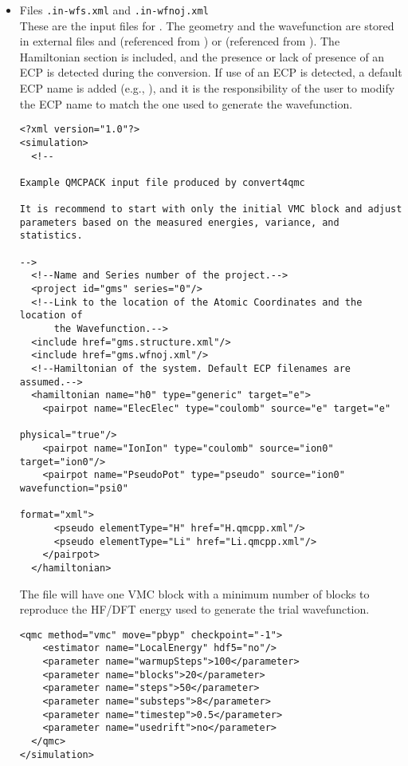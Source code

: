 \begin{itemize}
 \item Files \texttt{.in-wfs.xml} and \texttt{.in-wfnoj.xml} \\ These
   are the input files for \qmcpack.  The geometry and the
   wavefunction are stored in external files 
   and  (referenced from ) or
    (referenced from
   ). The Hamiltonian section is included,
   and the presence or lack of presence of an ECP is detected during the
   conversion. If use of an ECP is detected, a default ECP name is
   added (e.g., ), and it is the responsibility of
   the user to modify the ECP name to match the one used to generate
   the wavefunction.\\
\begin{lstlisting}[style=QMCPXML]
  <?xml version="1.0"?>
<simulation>
  <!--
 
Example QMCPACK input file produced by convert4qmc
 
It is recommend to start with only the initial VMC block and adjust
parameters based on the measured energies, variance, and statistics.

-->
  <!--Name and Series number of the project.-->
  <project id="gms" series="0"/>
  <!--Link to the location of the Atomic Coordinates and the location of 
      the Wavefunction.-->
  <include href="gms.structure.xml"/>
  <include href="gms.wfnoj.xml"/>
  <!--Hamiltonian of the system. Default ECP filenames are assumed.-->
  <hamiltonian name="h0" type="generic" target="e">
    <pairpot name="ElecElec" type="coulomb" source="e" target="e" 
                                                   physical="true"/>
    <pairpot name="IonIon" type="coulomb" source="ion0" target="ion0"/>
    <pairpot name="PseudoPot" type="pseudo" source="ion0" wavefunction="psi0" 
                                                           format="xml">
      <pseudo elementType="H" href="H.qmcpp.xml"/>
      <pseudo elementType="Li" href="Li.qmcpp.xml"/>
    </pairpot>
  </hamiltonian>

 \end{lstlisting}

 The  file will have one VMC block with a
 minimum number of blocks to reproduce the HF/DFT energy used to
 generate the trial wavefunction.
 
 \begin{lstlisting}[style=QMCPXML]
  <qmc method="vmc" move="pbyp" checkpoint="-1">
    <estimator name="LocalEnergy" hdf5="no"/>
    <parameter name="warmupSteps">100</parameter>
    <parameter name="blocks">20</parameter>
    <parameter name="steps">50</parameter>
    <parameter name="substeps">8</parameter>
    <parameter name="timestep">0.5</parameter>
    <parameter name="usedrift">no</parameter>
  </qmc>
</simulation>
 \end{lstlisting}


\end{itemize}
